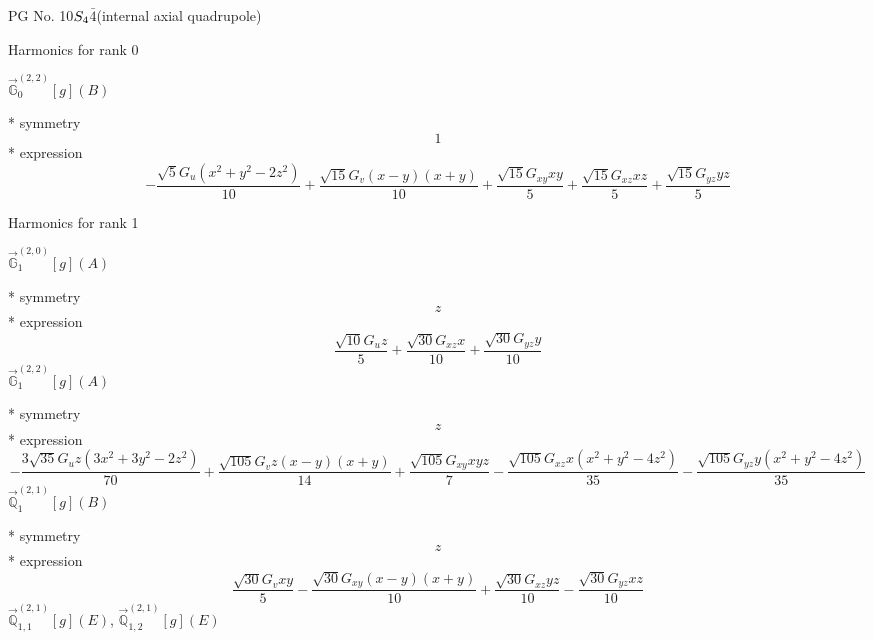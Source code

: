 \documentclass[fleqn,8pt]{jsarticle}
\begin{document}
\setcounter{MaxMatrixCols}{32}

\renewcommand{\tablename}{Table~}
\renewcommand{\figurename}{Figure~}
\begin{center}
\LARGE
PG No. 10\quad$S_{\rm 4}$\quad$\bar{4}$\quad[ tetragonal ] (internal axial quadrupole)
\end{center}

\noindent * Harmonics for rank 0

\noindent\quad $\vec{\mathbb{G}}_{0}^{(2,2)}[g](B)$

\noindent\quad ** symmetry
\begin{dmath*}
1
\end{dmath*}
\noindent\quad ** expression
\begin{dmath*}
- \frac{\sqrt{5} G_{u} \left(x^{2} + y^{2} - 2 z^{2}\right)}{10} + \frac{\sqrt{15} G_{v} \left(x - y\right) \left(x + y\right)}{10} + \frac{\sqrt{15} G_{xy} x y}{5} + \frac{\sqrt{15} G_{xz} x z}{5} + \frac{\sqrt{15} G_{yz} y z}{5}
\end{dmath*}

\noindent * Harmonics for rank 1

\noindent\quad $\vec{\mathbb{G}}_{1}^{(2,0)}[g](A)$

\noindent\quad ** symmetry
\begin{dmath*}
z
\end{dmath*}
\noindent\quad ** expression
\begin{dmath*}
\frac{\sqrt{10} G_{u} z}{5} + \frac{\sqrt{30} G_{xz} x}{10} + \frac{\sqrt{30} G_{yz} y}{10}
\end{dmath*}
\noindent\quad $\vec{\mathbb{G}}_{1}^{(2,2)}[g](A)$

\noindent\quad ** symmetry
\begin{dmath*}
z
\end{dmath*}
\noindent\quad ** expression
\begin{dmath*}
- \frac{3 \sqrt{35} G_{u} z \left(3 x^{2} + 3 y^{2} - 2 z^{2}\right)}{70} + \frac{\sqrt{105} G_{v} z \left(x - y\right) \left(x + y\right)}{14} + \frac{\sqrt{105} G_{xy} x y z}{7} - \frac{\sqrt{105} G_{xz} x \left(x^{2} + y^{2} - 4 z^{2}\right)}{35} - \frac{\sqrt{105} G_{yz} y \left(x^{2} + y^{2} - 4 z^{2}\right)}{35}
\end{dmath*}
\noindent\quad $\vec{\mathbb{Q}}_{1}^{(2,1)}[g](B)$

\noindent\quad ** symmetry
\begin{dmath*}
z
\end{dmath*}
\noindent\quad ** expression
\begin{dmath*}
\frac{\sqrt{30} G_{v} x y}{5} - \frac{\sqrt{30} G_{xy} \left(x - y\right) \left(x + y\right)}{10} + \frac{\sqrt{30} G_{xz} y z}{10} - \frac{\sqrt{30} G_{yz} x z}{10}
\end{dmath*}
\noindent\quad $\vec{\mathbb{Q}}_{1,1}^{(2,1)}[g](E)$, $\vec{\mathbb{Q}}_{1,2}^{(2,1)}[g](E)$
\end{document}
